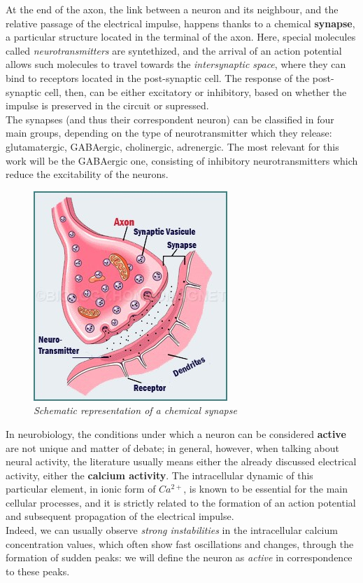 \documentclass[a4paper]{article}
\begin{document}
At the end of the axon, the link between a neuron and its neighbour, and the relative passage of the electrical impulse, happens thanks to a chemical \textbf{synapse}, a particular structure located in the terminal of the axon. Here, special molecules called \textit{neurotransmitters} are syntethized, and the arrival of an action potential allows such molecules to travel towards the \textit{intersynaptic space}, where they can bind to receptors located in the post-synaptic cell. The response of the post-synaptic cell, then, can be either excitatory or inhibitory, based on whether the impulse is preserved in the circuit or supressed.\\
The synapses (and thus their correspondent neuron) can be classified in four main groups, depending on the type of neurotransmitter which they release:  glutamatergic, GABAergic, cholinergic,  adrenergic. The most relevant for this work will be the GABAergic one, consisting of inhibitory neurotransmitters which reduce the excitability of the neurons.
\begin{figure}[H]
	\begin{center}
		\includegraphics[scale=1.6]{synapse.jpg} 
	\end{center} 
	\caption{\textit{Schematic representation of a chemical synapse}}
	
\end{figure}



In neurobiology, the conditions under which a neuron can be considered \textbf{active} are not unique and matter of debate; in general, however, when talking about neural activity, the literature usually means either the already discussed electrical activity, either the \textbf{calcium activity}. The intracellular dynamic of this particular element, in ionic form of $Ca^{2+}$, is known to be essential for the main cellular processes, and it is strictly related to the formation of an action potential and subsequent propagation of the electrical impulse.\\
 Indeed, we can usually observe  \textit{strong instabilities} in the intracellular calcium concentration values, which often show fast oscillations and changes, through the formation of sudden peaks: we will define the neuron as \textit{active} in correspondence to these peaks.
\end{document}

